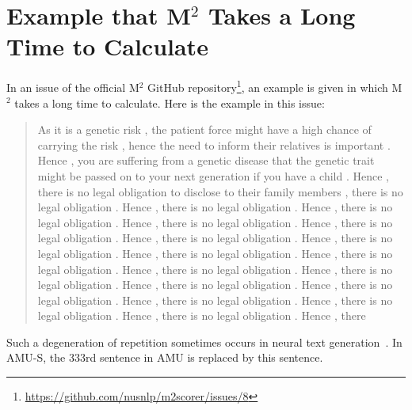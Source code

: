 \documentclass[11pt]{article}
\begin{document}


\appendix

\section{Example that M${}^2$ Takes a Long Time to Calculate}
\label{sec:appendix}

In an issue of the official M${}^2$ GitHub repository\footnote{\url{https://github.com/nusnlp/m2scorer/issues/8}}, an example is given in which M${}^2$ takes a long time to calculate.
Here is the example in this issue:
\begin{quote}
As it is a genetic risk , the patient force might have a high chance of carrying the risk , hence the need to inform their relatives is important . Hence , you are suffering from a genetic disease that the genetic trait might be passed on to your next generation if you have a child . Hence , there is no legal obligation to disclose to their family members , there is no legal obligation . Hence , there is no legal obligation . Hence , there is no legal obligation . Hence , there is no legal obligation . Hence , there is no legal obligation . Hence , there is no legal obligation . Hence , there is no legal obligation . Hence , there is no legal obligation . Hence , there is no legal obligation . Hence , there is no legal obligation . Hence , there is no legal obligation . Hence , there is no legal obligation . Hence , there is no legal obligation . Hence , there is no legal obligation . Hence , there is no legal obligation . Hence , there is no legal obligation . Hence , there
\end{quote}
Such a degeneration of repetition sometimes occurs in neural text generation~\citep{DBLP:conf/iclr/HoltzmanBDFC20}.
In \textsf{AMU-S}, the 333rd sentence in \textsf{AMU} is replaced by this sentence.
\end{document}
